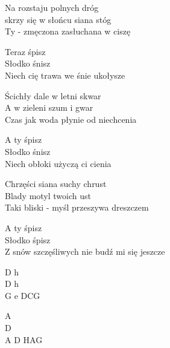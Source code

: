 \begin{textn}
    Na rozstaju polnych dróg\\
    skrzy się w słońcu siana stóg\\
    Ty - zmęczona zasłuchana w ciszę

    Teraz śpisz\\
    Słodko śnisz\\
    Niech cię trawa we śnie ukołysze

    Ścichły dale w letni skwar\\
    A w zieleni szum i gwar\\
    Czas jak woda płynie od niechcenia

    A ty śpisz\\
    Słodko śnisz\\
    Niech obłoki użyczą ci cienia

    Chrzęści siana suchy chrust\\
    Blady motyl twoich ust\\
    Taki bliski - myśl przeszywa dreszczem

    A ty śpisz\\
    Słodko śpisz\\
    Z snów szczęśliwych nie budź mi się jeszcze
\end{textn}
\begin{chordw}
    D h\\
    D h\\
    G e DCG

    A\\
    D\\
    A D HAG
\end{chordw}